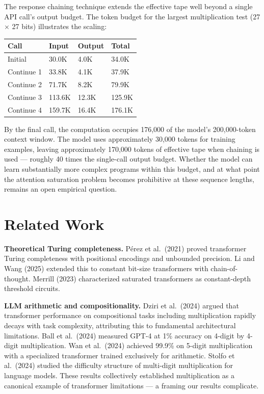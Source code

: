 \documentclass[twocolumn,switch,10pt]{article}
\begin{document}
The response chaining technique extends the effective tape well beyond a single API call's output budget. The token budget for the largest multiplication test (27 \(\times\) 27 bits) illustrates the scaling:

{\def\LTcaptype{none} %
\begin{table}[t]
\centering

\begin{tabular}{@{}llll@{}}\toprule
Call & Input & Output & Total \\
\midrule

Initial & 30.0K & 4.0K & 34.0K \\
Continue 1 & 33.8K & 4.1K & 37.9K \\
Continue 2 & 71.7K & 8.2K & 79.9K \\
Continue 3 & 113.6K & 12.3K & 125.9K \\
Continue 4 & 159.7K & 16.4K & 176.1K \\
\bottomrule
\end{tabular}
\end{table}
}

By the final call, the computation occupies 176,000 of the model's 200,000-token context window. The model uses approximately 30,000 tokens for training examples, leaving approximately 170,000 tokens of effective tape when chaining is used --- roughly 40 times the single-call output budget. Whether the model can learn substantially more complex programs within this budget, and at what point the attention saturation problem becomes prohibitive at these sequence lengths, remains an open empirical question.

\section{Related Work}\label{sec:related}

\textbf{Theoretical Turing completeness.} Pérez et al.~(2021) proved transformer Turing completeness with positional encodings and unbounded precision. Li and Wang (2025) extended this to constant bit-size transformers with chain-of-thought. Merrill (2023) characterized saturated transformers as constant-depth threshold circuits.

\textbf{LLM arithmetic and compositionality.} Dziri et al.~(2024) argued that transformer performance on compositional tasks including multiplication rapidly decays with task complexity, attributing this to fundamental architectural limitations. Ball et al.~(2024) measured GPT-4 at 1\% accuracy on 4-digit by 4-digit multiplication. Wan et al.~(2024) achieved 99.9\% on 5-digit multiplication with a specialized transformer trained exclusively for arithmetic. Stolfo et al.~(2024) studied the difficulty structure of multi-digit multiplication for language models. These results collectively established multiplication as a canonical example of transformer limitations --- a framing our results complicate.
\end{document}
